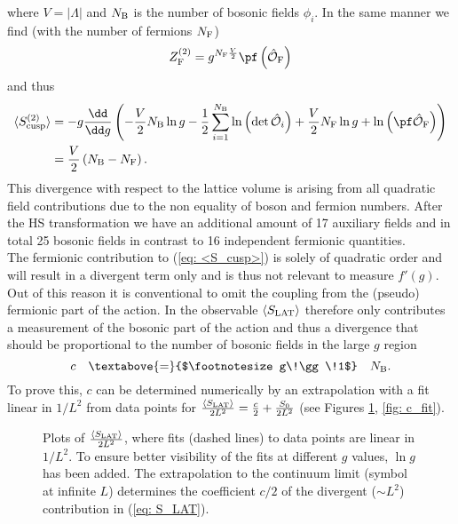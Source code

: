 %
%
where $V=\vert \mathit{\Lambda}\vert$ and $N_{\rm B}$ is the number of bosonic fields $\phi_{i}$. In the same manner we find (with the number of fermions $N_{\rm F}$)
%
%
\begin{equation}
Z_{\rm F}^{(2)}= g^{N_{\rm F}\frac{V}{2}} \pf \left(\hat{\mathcal{O}}_{\rm F} \right)
\end{equation}
%
%
and thus
%
%
\begin{equation}
\begin{alignedat}{2}
\langle S_{\rm cusp}^{(2)} \rangle &= -g \frac{\dd }{\dd g} \left( -\frac{V}{2}N_{\rm B} \ln g -\frac{1}{2} \sum\limits_{i=1}^{N_{\rm B}} \ln \left(\det \hat{\mathcal{O}}_{i}\right) + \frac{V}{2} N_{\rm F} \ln g + \ln \left( \pf \hat{\mathcal{O}}_{\rm F} \right) \right) \\
%
%
&= \frac{V}{2} \left(N_{\rm B} - N_{\rm F}\right).
\end{alignedat}
\end{equation}
%
%
This divergence with respect to the lattice volume is arising from all quadratic field contributions due to the non equality of boson and fermion numbers. After the HS transformation we have an additional amount of 17 auxiliary fields and in total 25 bosonic fields in contrast to 16 independent fermionic quantities. \\
The fermionic contribution to (\ref{eq: <S_cusp>}) is solely of quadratic order and will result in a divergent term only and is thus not relevant to measure $f'(g)$. Out of this reason it is conventional  to omit the coupling from the (pseudo) fermionic part of the action. In the observable $\langle S_{\rm LAT} \rangle$ therefore only contributes a measurement of the bosonic part of the action and thus a divergence that should be proportional to the number of bosonic fields in the large $g$ region
%
%
\begin{equation}
c\quad \textabove{=}{$\footnotesize g\!\gg\!1$} \quad N_{\rm B}.
\end{equation}
%
%
To prove this, $c$ can be determined numerically by an extrapolation with a fit linear in $1/L^{2}$ from data points for $\frac{\langle S_{\rm LAT}\rangle}{2L^{2}} = \frac{c}{2}+ \frac{S_{0}}{2L^{2}}$ (see Figures \ref{fig: Slat_over_N2}, \ref{fig: c_fit}).
%
%
\begin{figure}[ht!]
\centering

\caption{Plots of $\frac{\langle S_{\rm LAT}\rangle}{2L^{2}}$, where fits (dashed lines) to data points are linear in $1/L^{2}$. To ensure better visibility of the fits at different $g$ values, $\ln g$ has been added. The extrapolation to the continuum limit (symbol at infinite $L$) determines the coefficient $c/2$ of the divergent ($\sim L^{2}$) contribution in (\ref{eq: S_LAT}).
\label{fig: Slat_over_N2}}
\end{figure}
